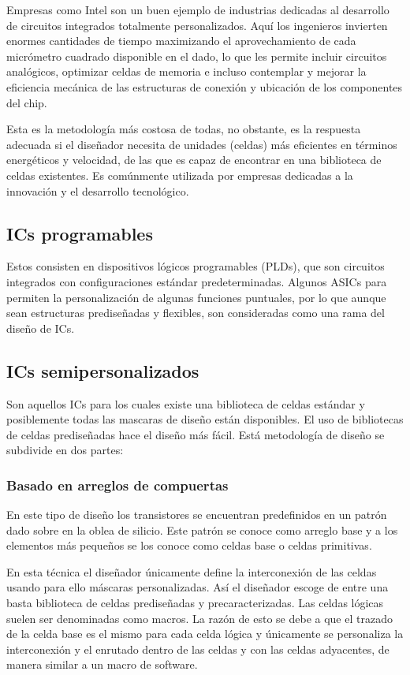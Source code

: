 Empresas como Intel son un buen ejemplo de industrias dedicadas al desarrollo de circuitos integrados totalmente personalizados. Aquí los ingenieros invierten enormes cantidades de tiempo maximizando el aprovechamiento de cada micrómetro cuadrado disponible en el dado, lo que les permite incluir circuitos analógicos, optimizar celdas de memoria e incluso contemplar y mejorar la eficiencia mecánica de las estructuras de conexión y ubicación de los componentes del chip.

Esta es la metodología más costosa de todas, no obstante, es la respuesta adecuada si el diseñador necesita de unidades (celdas) más eficientes en términos energéticos y velocidad, de las que es capaz de encontrar en una biblioteca de celdas existentes. Es comúnmente utilizada por empresas dedicadas a la innovación y el desarrollo tecnológico.

\subsection{\textbf{ICs programables}}

Estos consisten en dispositivos lógicos programables (PLDs), que son circuitos integrados con configuraciones estándar predeterminadas. Algunos ASICs para permiten la personalización de algunas funciones puntuales, por lo que aunque sean estructuras prediseñadas y flexibles, son consideradas como una rama del diseño de ICs.

\subsection{\textbf{ICs semipersonalizados}}

Son aquellos ICs para los cuales existe una biblioteca de celdas estándar y posiblemente todas las mascaras de diseño están disponibles. El uso de bibliotecas de celdas prediseñadas hace el diseño más fácil. Está metodología de diseño se subdivide en dos partes:

\subsubsection{Basado en arreglos de compuertas}

En este tipo de diseño los transistores se encuentran predefinidos en un patrón dado sobre en la oblea de silicio. Este patrón se conoce como arreglo base y a los elementos más pequeños se los conoce como celdas base o celdas primitivas.

En esta técnica el diseñador únicamente define la interconexión de las celdas usando para ello máscaras personalizadas. Así el diseñador escoge de entre una basta biblioteca de celdas prediseñadas y precaracterizadas. Las celdas lógicas suelen ser denominadas como macros. La razón de esto se debe a que el trazado de la celda base es el mismo para cada celda lógica y únicamente se personaliza la interconexión y el enrutado dentro de las celdas y con las celdas adyacentes, de manera similar a un macro de software.

